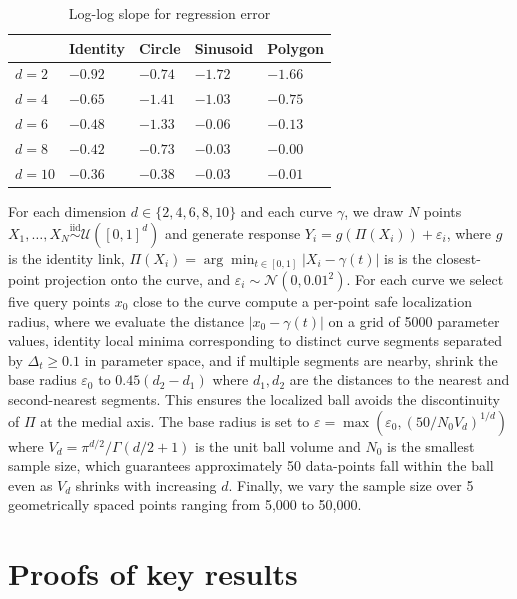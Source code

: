 \documentclass[11pt]{article}
\begin{document}
\begin{table}[h]
\small
\centering
 \begin{tabular}{l | >{\centering\arraybackslash}p{}  >{\centering\arraybackslash}p{}  >{\centering\arraybackslash}p{} >{\centering\arraybackslash}p{} }
  \toprule  & Identity &  Circle & Sinusoid & Polygon \\
\midrule
 \hline
 $d = 2$ & $-0.92$ & $-0.74$ & $-1.72$ & $-1.66$ \\
 $d = 4$ & $-0.65$ & $-1.41$ & $-1.03$ & $-0.75$ \\
 $d = 6$ & $-0.48$ & $-1.33$ & $-0.06$ & $-0.13$ \\
 $d = 8$ & $-0.42$ & $-0.73$ & $-0.03$ & $-0.00$ \\
 $d = 10$ & $-0.36$ & $-0.38$ & $-0.03$ & $-0.01$ \\
\bottomrule
 \end{tabular}
 \caption{Log-log slope for regression error}
\end{table}

For each dimension \(d \in \{2, 4, 6, 8, 10\}\) and each curve \(\gamma\), we draw \(N\) points \(X_1, \dots, X_N \stackrel{\text{iid}}{\sim} \mathcal{U}([0,1]^d)\) and generate response \(Y_i = g(\Pi(X_i)) + \varepsilon_i\), where \(g\) is the identity link, \(\Pi(X_i) = \arg \min_{t \in [0, 1]}|X_i - \gamma(t)|\) is is the closest-point projection onto the curve, and \(\varepsilon_i \sim \mathcal{N}(0, 0.01^2)\). For each curve we select five query points \(x_0\) close to the curve compute a per-point safe localization radius, where we evaluate the distance \(|x_0 - \gamma(t)|\) on a grid of 5000 parameter values, identity local minima corresponding to distinct curve segments separated by \(\Delta_t \ge 0.1\) in parameter space, and if multiple segments are nearby, shrink the base radius \(\varepsilon_0\) to \(0.45(d_2 - d_1)\) where \(d_1, d_2\) are the distances to the nearest and second-nearest segments. This ensures the localized ball avoids the discontinuity of \(\Pi\) at the medial axis. The base radius is set to \(\varepsilon = \max(\varepsilon_0, (50/N_0 V_d)^{1/d})\) where \(V_d = \pi^{d/2}/\Gamma(d/2 + 1)\) is the unit ball volume and \(N_0\) is the smallest sample size, which guarantees approximately 50 data-points fall within the ball even as \(V_d\) shrinks with increasing \(d\). Finally, we vary the sample size over 5 geometrically spaced points ranging from 5,000 to 50,000.

\section{Proofs of key results}
\end{document}
